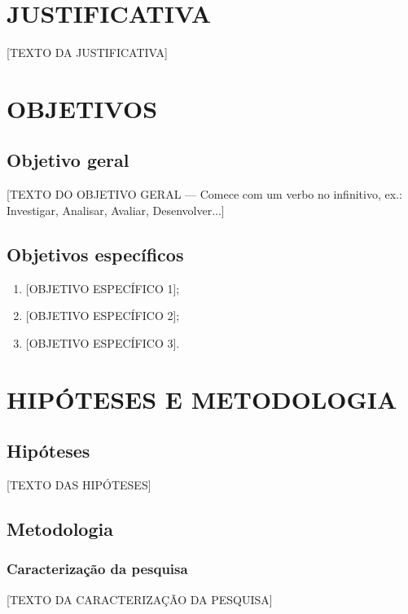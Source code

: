 \documentclass[12pt,a4paper,oneside]{article}
\newcommand{\Secao}[1]{%
  \ifSecoesEmNovaPagina\clearpage\fi
  \section{#1}%
}
\newcommand{\Subsecao}[1]{\subsection{#1}}
\newcommand{\Subsubsecao}[1]{\subsubsection{#1}}
\newenvironment{ListaAlfab}{%
  \begin{enumerate}[label=\alph*),leftmargin=1.25cm,labelsep=.5em,itemsep=0pt,parsep=0pt,topsep=0pt]%
}{%
  \end{enumerate}%
}
\begin{document}
\Secao{JUSTIFICATIVA}

[TEXTO DA JUSTIFICATIVA]



\Secao{OBJETIVOS}

\Subsecao{Objetivo geral}
[TEXTO DO OBJETIVO GERAL — Comece com um verbo no infinitivo, ex.: Investigar, Analisar, Avaliar, Desenvolver...]

\Subsecao{Objetivos específicos}
\begin{ListaAlfab}
  \item {}[OBJETIVO ESPECÍFICO 1];
  \item {}[OBJETIVO ESPECÍFICO 2];
  \item {}[OBJETIVO ESPECÍFICO 3].
\end{ListaAlfab}



\Secao{HIPÓTESES E METODOLOGIA}

\Subsecao{Hipóteses}
[TEXTO DAS HIPÓTESES]

\Subsecao{Metodologia}

\Subsubsecao{Caracterização da pesquisa}
[TEXTO DA CARACTERIZAÇÃO DA PESQUISA]
\end{document}

